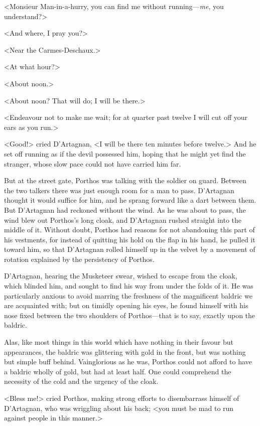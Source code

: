 <Monsieur Man-in-a-hurry, you can find me without running—\emph{me}, you understand?> 

<And where, I pray you?> 

<Near the Carmes-Deschaux.> 

<At what hour?> 

<About noon.> 

<About noon? That will do; I will be there.> 

<Endeavour not to make me wait; for at quarter past twelve I will cut off your ears as you run.> 

<Good!> cried D'Artagnan, <I will be there ten minutes before twelve.> And he set off running as if the devil possessed him, hoping that he might yet find the stranger, whose slow pace could not have carried him far. 

But at the street gate, Porthos was talking with the soldier on guard. Between the two talkers there was just enough room for a man to pass. D'Artagnan thought it would suffice for him, and he sprang forward like a dart between them. But D'Artagnan had reckoned without the wind. As he was about to pass, the wind blew out Porthos's long cloak, and D'Artagnan rushed straight into the middle of it. Without doubt, Porthos had reasons for not abandoning this part of his vestments, for instead of quitting his hold on the flap in his hand, he pulled it toward him, so that D'Artagnan rolled himself up in the velvet by a movement of rotation explained by the persistency of Porthos. 

D'Artagnan, hearing the Musketeer swear, wished to escape from the cloak, which blinded him, and sought to find his way from under the folds of it. He was particularly anxious to avoid marring the freshness of the magnificent baldric we are acquainted with; but on timidly opening his eyes, he found himself with his nose fixed between the two shoulders of Porthos—that is to say, exactly upon the baldric. 

Alas, like most things in this world which have nothing in their favour but appearances, the baldric was glittering with gold in the front, but was nothing but simple buff behind. Vainglorious as he was, Porthos could not afford to have a baldric wholly of gold, but had at least half. One could comprehend the necessity of the cold and the urgency of the cloak. 

<Bless me!> cried Porthos, making strong efforts to disembarrass himself of D'Artagnan, who was wriggling about his back; <you must be mad to run against people in this manner.> 

